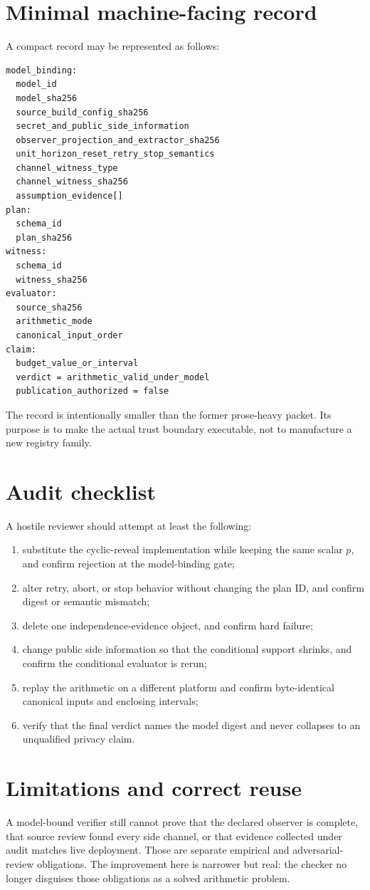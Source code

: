 \documentclass[11pt]{article}
\begin{document}
\section{Minimal machine-facing record}\label{sec:schema}
A compact record may be represented as follows:
\begin{verbatim}
model_binding:
  model_id
  model_sha256
  source_build_config_sha256
  secret_and_public_side_information
  observer_projection_and_extractor_sha256
  unit_horizon_reset_retry_stop_semantics
  channel_witness_type
  channel_witness_sha256
  assumption_evidence[]
plan:
  schema_id
  plan_sha256
witness:
  schema_id
  witness_sha256
evaluator:
  source_sha256
  arithmetic_mode
  canonical_input_order
claim:
  budget_value_or_interval
  verdict = arithmetic_valid_under_model
  publication_authorized = false
\end{verbatim}

The record is intentionally smaller than the former prose-heavy packet. Its purpose is to make the actual trust boundary executable, not to manufacture a new registry family.

\section{Audit checklist}\label{sec:audit}
A hostile reviewer should attempt at least the following:
\begin{enumerate}[leftmargin=*]
\item substitute the cyclic-reveal implementation while keeping the same scalar \(p\), and confirm rejection at the model-binding gate;
\item alter retry, abort, or stop behavior without changing the plan ID, and confirm digest or semantic mismatch;
\item delete one independence-evidence object, and confirm hard failure;
\item change public side information so that the conditional support shrinks, and confirm the conditional evaluator is rerun;
\item replay the arithmetic on a different platform and confirm byte-identical canonical inputs and enclosing intervals;
\item verify that the final verdict names the model digest and never collapses to an unqualified privacy claim.
\end{enumerate}

\section{Limitations and correct reuse}\label{sec:limits}
A model-bound verifier still cannot prove that the declared observer is complete, that source review found every side channel, or that evidence collected under audit matches live deployment. Those are separate empirical and adversarial-review obligations. The improvement here is narrower but real: the checker no longer disguises those obligations as a solved arithmetic problem.
\end{document}
